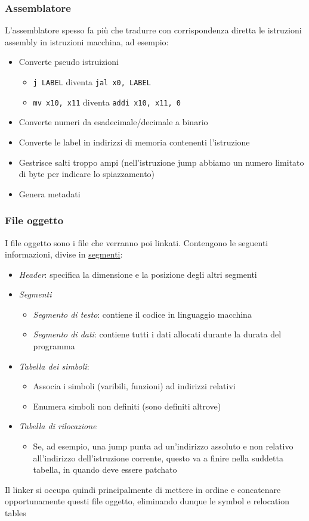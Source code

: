 \subsubsection*{Assemblatore}
L'assemblatore spesso fa più che tradurre con corrispondenza diretta le istruzioni assembly in istruzioni macchina, ad esempio:
\begin{itemize}
	\item Converte pseudo istruizioni
	      \begin{itemize}
		      \item \verb|j LABEL| diventa \verb|jal x0, LABEL|
		      \item \verb|mv x10, x11| diventa \verb|addi x10, x11, 0|
	      \end{itemize}
	\item Converte numeri da esadecimale/decimale a binario
	\item Converte le label in indirizzi di memoria contenenti l'istruzione
	\item Gestrisce salti troppo ampi (nell'istruzione jump abbiamo un numero limitato di byte per indicare lo spiazzamento)
	\item Genera metadati
\end{itemize}
\subsubsection*{File oggetto}
I file oggetto sono i file che verranno poi linkati. Contengono le seguenti informazioni, divise in \underline{segmenti}:
\begin{itemize}
	\item \textit{Header}: specifica la dimensione e la posizione degli altri segmenti
	\item \textit{Segmenti}
	      \begin{itemize}
		      \item \textit{Segmento di testo}: contiene il codice in linguaggio macchina
		      \item \textit{Segmento di dati}: contiene tutti i dati allocati durante la durata del programma
	      \end{itemize}
	\item \textit{Tabella dei simboli}:
	      \begin{itemize}
		      \item Associa i simboli (varibili, funzioni) ad indirizzi relativi
		      \item Enumera simboli non definiti (sono definiti altrove)
	      \end{itemize}
	\item \textit{Tabella di rilocazione}
	      \begin{itemize}
		      \item Se, ad esempio, una jump punta ad un'indirizzo assoluto e non relativo all'indirizzo dell'istruzione corrente, questo va a finire nella suddetta tabella, in quando deve essere patchato
	      \end{itemize}
\end{itemize}
Il linker si occupa quindi principalmente di mettere in ordine e concatenare opportunamente questi file oggetto, eliminando dunque le symbol e relocation tables
